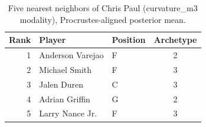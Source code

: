 \begin{table}[htbp]
  \centering\small
  \begin{tabular}{rllc}
    \toprule
    Rank & Player & Position & Archetype \\
    \midrule
    1 & Anderson Varejao & F & 2 \\
    2 & Michael Smith & F & 3 \\
    3 & Jalen Duren & C & 3 \\
    4 & Adrian Griffin & G & 2 \\
    5 & Larry Nance Jr. & F & 3 \\
    \bottomrule
  \end{tabular}
  \caption{Five nearest neighbors of Chris Paul (curvature_m3 modality), Procrustes-aligned posterior mean.}
  \label{tab:Chris_Paul_neighbors_curvature_m3}
\end{table}

